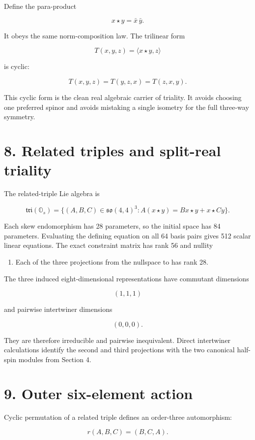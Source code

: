 \documentclass[11pt]{article}
\begin{document}
Define the para-product

\[
x\star y=\bar x\,\bar y.
\]

It obeys the same norm-composition law. The trilinear form

\[
T(x,y,z)=\langle x\star y,z\rangle
\]

is cyclic:

\[
T(x,y,z)=T(y,z,x)=T(z,x,y).
\]

This cyclic form is the clean real algebraic carrier of triality. It avoids choosing one preferred spinor and avoids mistaking a single isometry for the full three-way symmetry.

\section{8. Related triples and split-real triality}

The related-triple Lie algebra is

\[
\mathfrak{tri}(\mathbb O_s)=
\{(A,B,C)\in\mathfrak{so}(4,4)^3:
A(x\star y)=Bx\star y+x\star Cy\}.
\]

Each skew endomorphism has 28 parameters, so the initial space has 84 parameters. Evaluating the defining equation on all 64 basis pairs gives 512 scalar linear equations. The exact constraint matrix has rank 56 and nullity

\begin{enumerate}
\item Each of the three projections from the nullspace to \texttt{} has rank 28.
\end{enumerate}

The three induced eight-dimensional representations have commutant dimensions

\[
(1,1,1)
\]

and pairwise intertwiner dimensions

\[
(0,0,0).
\]

They are therefore irreducible and pairwise inequivalent. Direct intertwiner calculations identify the second and third projections with the two canonical half-spin modules from Section 4.

\section{9. Outer six-element action}

Cyclic permutation of a related triple defines an order-three automorphism:

\[
r(A,B,C)=(B,C,A).
\]
\end{document}
